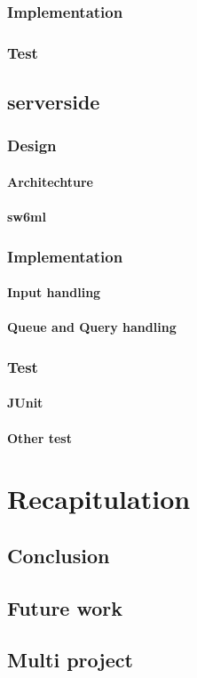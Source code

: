      \subsection{Implementation}
     \subsection{Test}

  \section{serverside} %
    \subsection{Design}
      \subsubsection{Architechture} %
      \subsubsection{sw6ml} %
    \subsection{Implementation}
      \subsubsection{Input handling} %
      \subsubsection{Queue and Query handling} %
    \subsection{Test}
      \subsubsection{JUnit}
      \subsubsection{Other test}

\chapter{Recapitulation}
  \section{Conclusion}
  \section{Future work}
  \section{Multi project} %



\appendix


